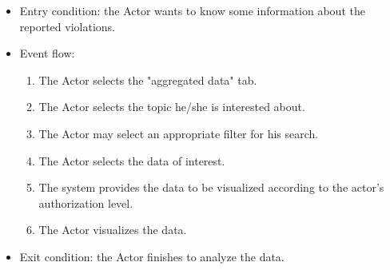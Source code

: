 \begin{itemize}
\begin{itemize}
                \item Entry condition: the Actor wants to know some information about the reported violations.
                \item Event flow:
                \begin{enumerate}
                    \item The Actor selects the "aggregated data" tab.
                    \item The Actor selects the topic he/she is interested about.
                    \item The Actor may select an appropriate filter for his search.
                    \item The Actor selects the data of interest.
                    \item The system provides the data to be visualized according to the actor's authorization level.
                    \item The Actor visualizes the data.
                \end{enumerate}
                \item Exit condition: the Actor finishes to analyze the data.
            \end{itemize}
        \end{itemize}